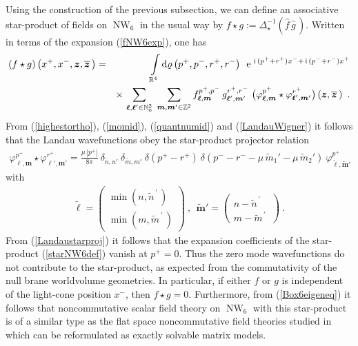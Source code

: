\documentclass[11pt,a4paper]{article}
\DeclareMathOperator{\NW}{NW}
\newcommand{\ii}{{\rm i}}
\newcommand{\mbf}[1]{{\boldsymbol {#1} }}
\def\ii{{\,{\rm i}\,}}
\def\dd{{\rm d}}
\def\mz{{\mbf z}}
\def\mm{{\mbf m}}
\def\mell{{\mbf\ell}}
\newcommand{\zed}{{\mathbb Z}} %
\newcommand{\nat}{{\mathbb N}} %
\newcommand{\real}{{\mathbb R}} %
\def\e{{\,\rm e}\,}
\def\bea{\begin{eqnarray}}
\def\eea{\end{eqnarray}}
\newcommand{\beq}{\begin{eqnarray}}
\newcommand{\eeq}{\end{eqnarray}}
\begin{document}
Using the construction of the previous subsection, we can define an
associative star-product of fields on $\NW_6$ in the usual way by $f\star
g:=\Delta_\star^{-1}(\hat f\,\hat g\,)$. Written in terms of the
expansion (\ref{fNW6exp}), one has
\bea
(f\star g)\left(x^+,x^-,\mz,\overline{\mz}\,\right)&=&
\int\limits_{\real^4}\dd\varrho\left(p^+,p^-,r^+,r^-\right)~
\e^{\ii(p^++r^+)x^-+\ii(p^-+r^-)x^+}\nonumber\\ &&\times\,
\sum_{\mell,\mell'\in\nat_0^2}~\sum_{\mm,\mm'\in\zed^2}
f_{\mell,\mm}^{p^+,p^-}\,
g_{\mell',\mm'}^{r^+,r^-}~\bigl(\varphi_{\mell,\mm}^{p^+}
\star\varphi_{\mell',\mm'}^{r^+}\bigr)\left(\mz,\overline{\mz}\,
\right) \ .
\label{starNW6def}\eea
{}From (\ref{highestortho}), (\ref{momid}), (\ref{quantnumid}) and
(\ref{LandauWigner}) it follows that the Landau wavefunctions obey the
star-product projector relation~\cite{LSZ1}
\beq
\varphi_{\mell,\mm}^{p^+}\star\varphi_{\mell',\mm'}^{r^+}=
\mbox{$\frac{\mu\,\left|p^+\right|}{8\pi}$}~\delta_{\widetilde{n},n'}~
\delta_{\widetilde{m},m'}~\delta\left(p^+-r^+
\right)~\delta\left(p^--r^--\mu\,\tilde m_1'-\mu\,\tilde m_2'
\right)~\varphi^{p^+}_{\tilde\mell,\tilde\mm'}
\label{Landaustarproj}\eeq
with
\beq
\tilde\mell=\begin{pmatrix}\min\left(n,\widetilde{n}^{\,\prime}\,\right)\\
\min\left(m,\widetilde{m}^{\,\prime}\,\right)\end{pmatrix} \ , ~~
\tilde\mm'=\begin{pmatrix}n-\widetilde{n}^{\,\prime}\,
\\m-\widetilde{m}^{\,\prime}\,\end{pmatrix} \ .
\label{quantnumtilde}\eeq
{}From (\ref{Landaustarproj}) it follows that the expansion coefficients
of the star-product (\ref{starNW6def}) vanish at
$p^+=0$. Thus the zero mode wavefunctions do not contribute to the
star-product, as expected from the commutativity of the null brane
worldvolume geometries. In particular, if either $f$ or $g$ is
independent of the light-cone position $x^-$, then $f\star
g=0$. Furthermore, from (\ref{Box6eigeneq}) it
follows that noncommutative scalar field theory on $\NW_6$ with this
star-product is of a similar type as the flat space noncommutative field
theories studied in~\cite{LSZ1} which can be reformulated as exactly
solvable matrix models.
\end{document}

